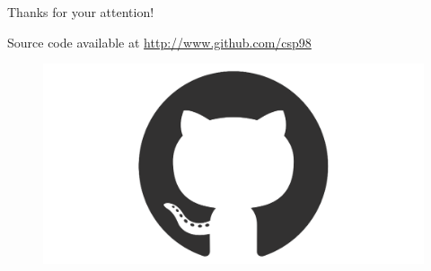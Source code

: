 \documentclass{beamer}
\begin{document}
\begin{frame}[fragile]
 \begin{center}
  \Huge
  Thanks for your attention!
 \end{center}
 \vspace{2cm}
 Source code available at \textcolor{blue}{\url{http://www.github.com/csp98}}
 \vspace{1cm}
 \begin{figure}[H]
  \centering
  \includegraphics[scale=0.05]{github-mark.png}
 \end{figure}

\end{frame}
\end{document}

